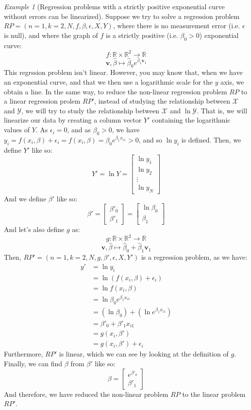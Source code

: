 \documentclass{article}
\theoremstyle{definition}
\theoremstyle{remark}
\theoremstyle{example}
\newtheorem{example}{Example}[section]
\newcommand{\vv}{\mathbf{v}}
\newcommand{\betat}{\hat{\beta}}
\newcommand{\fvector}[2]{\begin{bmatrix} #1_1 \\ #1_2 \\ \vdots \\ #1_{#2} \end{bmatrix}}
\begin{document}
\begin{example}[Regression problems with a strictly positive exponential curve without errors can be linearized]
		Suppose we try to solve a regression problem $RP = (n=1, k=2, N, f, \beta, \epsilon, X, Y)$, where there is no measurement error (i.e. $\epsilon$ is null), and where the graph of $f$ is a strictly positive (i.e. $\beta_0 > 0$) exponential curve:
				$$f : \mathbb{R} \times \mathbb{R}^2 \rightarrow \mathbb{R}$$
				$$\vv, \hat{\beta} \mapsto \hat{\beta}_0 e^{\hat{\beta}_1 \vv_1}$$
		This regrssion problem isn't linear. However, you may know that, when we have an exponential curve, and that we then use a logarithmic scale for the $y$ axis, we obtain a line. In the same way, to reduce the non-linear regression problem $RP$ to a linear regression prolem $RP'$, instead of studying the relationship between $\mathcal{X}$ and $\mathcal{Y}$, we will try to study the relationship between $\mathcal{X}$ and $\ln \mathcal{Y}$. That is, we will linearize our data by creating a column vector $Y'$ containing the logarithmic values of $Y$. As $\epsilon_i = 0$, and as $\beta_0 > 0$, we have $y_i = f(x_i, \beta) + \epsilon_i = f(x_i, \beta) = \beta_0 e^{\beta_1 x_{i1}} > 0$, and so $\ln y_i$ is defined. Then, we define $Y'$ like so:
				$$Y' = \ln Y = \fvector{\ln y}{N}$$
		And we define $\beta'$ like so:
				$$\beta' = \begin{bmatrix} \beta'_0 \\ \beta'_1 \end{bmatrix} = \begin{bmatrix} \ln \beta_0 \\ \beta_1 \end{bmatrix}$$
		And let's also define $g$ as:
				$$g : \mathbb{R} \times \mathbb{R}^2 \rightarrow \mathbb{R}$$
				$$\vv, \betat \mapsto \betat_0 + \betat_1 \vv_1$$
		Then, $RP' = (n=1, k=2, N, g, \beta', \epsilon, X, Y')$ is a regression problem, as we have:
		\begin{align*}
				y' &= \ln y_i\\
				   &= \ln (f(x_i, \beta) + \epsilon_i)\\
				   &= \ln f(x_i, \beta)\\
				   &= \ln \beta_0 e^{\beta_1 x_{i1}}\\
				   &= (\ln \beta_0) + (\ln e^{\beta_1 x_{i1}})\\
				   &= \beta'_0 + \beta'_1 x_{i1}\\
				   &= g(x_i, \beta')\\
				   &= g(x_i, \beta') + \epsilon_i
		\end{align*}
		Furthermore, $RP'$ is linear, which we can see by looking at the definition of $g$. Finally, we can find $\beta$ from $\beta'$ like so:
				$$\beta = \begin{bmatrix} e^{\beta'_0} \\ \beta'_1 \end{bmatrix}$$
		And therefore, we have reduced the non-linear problem $RP$ to the linear problem $RP'$.
\end{example}
\end{document}
